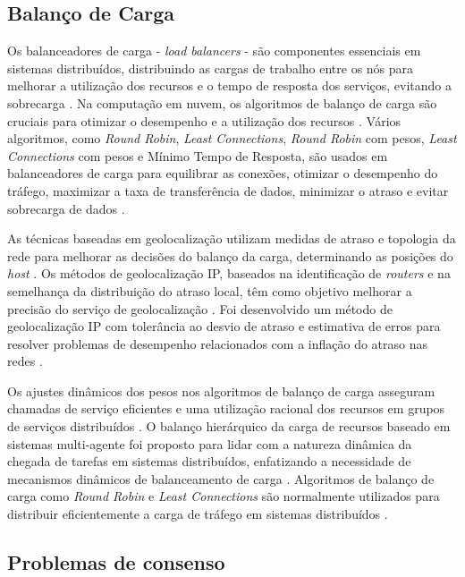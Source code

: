 \subsection{Balanço de Carga}

Os balanceadores de carga - \textit{load balancers} - são componentes essenciais em sistemas 
distribuídos, distribuindo as cargas de trabalho entre os nós para melhorar a utilização dos 
recursos e o tempo de resposta dos serviços, evitando a sobrecarga \cite{lb2012}. Na computação 
em nuvem, os algoritmos de balanço de carga são cruciais para otimizar o desempenho e a utilização 
dos recursos \cite{lb2016}. Vários algoritmos, como \textit{Round Robin}, \textit{Least Connections}, 
\textit{Round Robin} com pesos, \textit{Least Connections} com pesos e Mínimo Tempo de Resposta, 
são usados em balanceadores de carga para equilibrar as conexões, otimizar o desempenho do tráfego, 
maximizar a taxa de transferência de dados, minimizar o atraso e evitar sobrecarga de dados 
\cite{lb2021}.

As técnicas baseadas em geolocalização utilizam medidas de atraso e topologia da rede para melhorar 
as decisões do balanço da carga, determinando as posições do \textit{host} \cite{lb2016b}. Os 
métodos de geolocalização IP, baseados na identificação de \textit{routers} e na semelhança da 
distribuição do atraso local, têm como objetivo melhorar a precisão do serviço de geolocalização
\cite{lb2006}. Foi desenvolvido um método de geolocalização IP com tolerância ao desvio de atraso 
e estimativa de erros para resolver problemas de desempenho relacionados com a inflação do atraso 
nas redes \cite{lb2018}.

Os ajustes dinâmicos dos pesos nos algoritmos de balanço de carga asseguram chamadas de serviço 
eficientes e uma utilização racional dos recursos em grupos de serviços distribuídos \cite{lb2022}.
O balanço hierárquico da carga de recursos baseado em sistemas multi-agente foi proposto para 
lidar com a natureza dinâmica da chegada de tarefas em sistemas distribuídos, enfatizando a 
necessidade de mecanismos dinâmicos de balanceamento de carga \cite{lb2018b}. Algoritmos de 
balanço de carga como \textit{Round Robin} e \textit{Least Connections} são normalmente utilizados 
para distribuir eficientemente a carga de tráfego em sistemas distribuídos \cite{lb2010}.

\subsection{Problemas de consenso}

